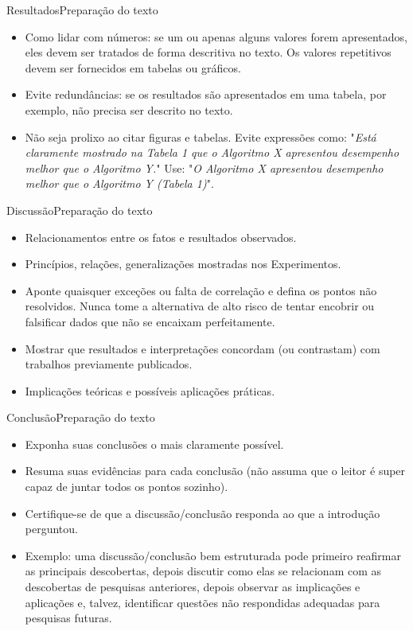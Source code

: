 \documentclass[t]{beamer}
\begin{document}
\begin{ftst}{Resultados}{Preparação do texto}
\justifying
\begin{itemize}
    \item Como lidar com números: se um ou apenas alguns valores forem apresentados, eles devem ser tratados de forma descritiva no texto. Os valores repetitivos devem ser fornecidos em tabelas ou gráficos.
    \vone
    \item Evite redundâncias: se os resultados são apresentados em uma tabela, por exemplo, não precisa ser descrito no texto.
    \vone
    \item Não seja prolixo ao citar figuras e tabelas. Evite expressões como: "\textit{Está claramente mostrado na Tabela 1 que o Algoritmo X apresentou desempenho melhor que o Algoritmo Y.}" Use: "\textit{O Algoritmo X apresentou desempenho melhor que o Algoritmo Y (Tabela 1)}".
\end{itemize}

\end{ftst}


\begin{ftst}{Discussão}{Preparação do texto}
\justifying
\begin{itemize}
    \item Relacionamentos entre os fatos e resultados observados.
    \vone
    \item Princípios, relações, generalizações mostradas nos Experimentos. 
    \vone
    \item Aponte quaisquer exceções ou falta de correlação e defina os pontos não resolvidos. Nunca tome a alternativa de alto risco de tentar encobrir ou falsificar dados que não se encaixam perfeitamente.
    \vone
    \item Mostrar que resultados e interpretações concordam (ou contrastam) com trabalhos previamente publicados.
    \vone
    \item Implicações teóricas e possíveis aplicações práticas.
\end{itemize}

\end{ftst}


\begin{ftst}{Conclusão}{Preparação do texto}
\justifying
\begin{itemize}
    \item Exponha suas conclusões o mais claramente possível.
    \vone
    \item Resuma suas evidências para cada conclusão  (não assuma que o leitor é super capaz de juntar todos os pontos sozinho).
    \vone
    \item Certifique-se de que a discussão/conclusão responda ao que a introdução perguntou.
    \vone
    \item Exemplo: uma discussão/conclusão bem estruturada pode primeiro reafirmar as principais descobertas, depois discutir como elas se relacionam com as descobertas de pesquisas anteriores, depois observar as implicações e aplicações e, talvez, identificar questões não respondidas adequadas para pesquisas futuras.
\end{itemize}

\end{ftst}
\end{document}
